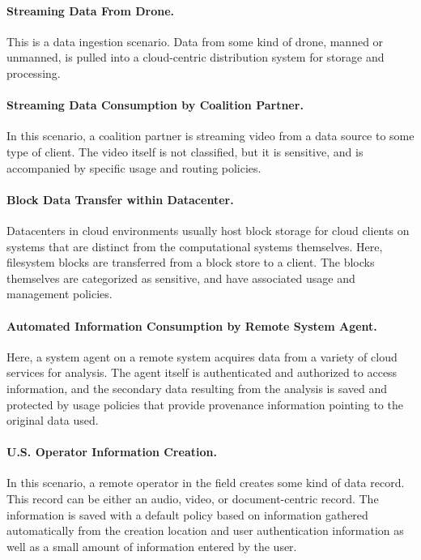 \documentclass[12pt,letterpaper]{article}
\begin{document}
\paragraph{Streaming Data From Drone.} This is a data ingestion scenario.  Data from some kind of drone, manned or unmanned, is pulled into a cloud-centric distribution system for storage and processing.

\paragraph{Streaming Data Consumption by Coalition Partner.} In this scenario, a coalition partner is streaming video from a data source to some type of client. The video itself is not classified, but it is sensitive, and is accompanied by specific usage and routing policies.

\paragraph{Block Data Transfer within Datacenter.} Datacenters in cloud environments usually host block storage for cloud clients on systems that are distinct from the computational systems themselves.  Here, filesystem blocks are transferred from a block store to a client.  The blocks themselves are categorized as sensitive, and have associated usage and management policies.

\paragraph{Automated Information Consumption by Remote System Agent.} Here, a system agent on a remote system acquires data from a variety of cloud services for analysis.  The agent itself is authenticated and authorized to access information, and the secondary data resulting from the analysis is saved and protected by usage policies that provide provenance information pointing to the original data used.

\paragraph{U.S. Operator Information Creation.} In this scenario, a remote operator in the field creates some kind of data record.  This record can be either an audio, video, or document-centric record.  The information is saved with a default policy based on information gathered automatically from the creation location and user authentication information as well as a small amount of information entered by the user.
\end{document}
